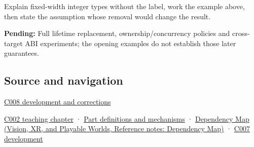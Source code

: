 \hypertarget{appendix-cc04044b5782-recall-and-next-depth}{}

Explain fixed-width integer types without the label, work the example above, then state the assumption whose removal would change the result.

\textbf{Pending:} Full lifetime replacement, ownership/concurrency policies and cross-target ABI experiments; the opening examples do not establish those later guarantees.

\subsection{Source and navigation}\label{appendix-cc04044b5782-source-and-navigation}

\hypertarget{appendix-cc04044b5782-source-and-navigation}{}

\hyperref[appendix-fd090d982a15-m008---parts-113-126]{C008 development and corrections}

\hyperref[01-foundations-i-ch001-arithmetic-becomes-a-policy]{C002 teaching chapter} · \hyperref[appendix-fd090d982a15]{Part definitions and mechanisms} · \href{../07-Vision-XR-and-Playable-Worlds/main.pdf\#nameddest=appendix-4ad47bdd269a}{Dependency Map (Vision, XR, and Playable Worlds, Reference notes: Dependency Map)} · \hyperref[01-foundations-i-ch002-choose-a-type-for-its-promise-not-its-familiar-size]{C007 development}
